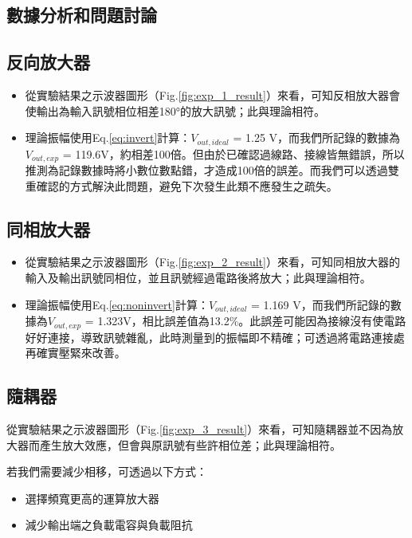 \documentclass[12pt,a4paper]{article}
\begin{document}
\begin{CJK}{UTF8}{bkai}
\section{數據分析和問題討論}\label{sec:discussion}
\hfill

\subsection{反向放大器}\label{subsec:discussion_1}
\hfill

\begin{itemize}
    \item 從實驗結果之示波器圖形（Fig.\ref{fig:exp_1_result}）來看，可知反相放大器會使輸出為輸入訊號相位相差180°的放大訊號；此與理論相符。
    \item 理論振幅使用Eq.\ref{eq:invert}計算：$V_{out, ideal}$ = 1.25 V，而我們所記錄的數據為$V_{out, exp}$ = 119.6V，約相差100倍。但由於已確認過線路、接線皆無錯誤，所以推測為記錄數據時將小數位數點錯，才造成100倍的誤差。而我們可以透過雙重確認的方式解決此問題，避免下次發生此類不應發生之疏失。 
\end{itemize}

\subsection{同相放大器}\label{subsec:discussion_2}
\hfill

\begin{itemize}
    \item 從實驗結果之示波器圖形（Fig.\ref{fig:exp_2_result}）來看，可知同相放大器的輸入及輸出訊號同相位，並且訊號經過電路後將放大；此與理論相符。
    \item 理論振幅使用Eq.\ref{eq:noninvert}計算：$V_{out, ideal}$ = 1.169 V，而我們所記錄的數據為$V_{out, exp}$ = 1.323V，相比誤差值為13.2\%。此誤差可能因為接線沒有使電路好好連接，導致訊號雜亂，此時測量到的振幅即不精確；可透過將電路連接處再確實壓緊來改善。
\end{itemize}


\clearpage
\subsection{隨耦器}\label{subsec:discussion_3}
\hfill

從實驗結果之示波器圖形（Fig.\ref{fig:exp_3_result}）來看，可知隨耦器並不因為放大器而產生放大效應，但會與原訊號有些許相位差；此與理論相符。

若我們需要減少相移，可透過以下方式： 
\begin{itemize}
    \item 選擇頻寬更高的運算放大器
    \item 減少輸出端之負載電容與負載阻抗
\end{itemize}


\end{CJK}
\end{document}
